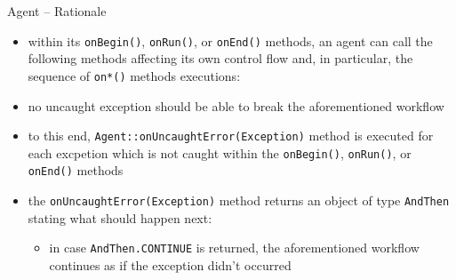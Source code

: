 \documentclass[presentation]{beamer}\mode<presentation>{\usetheme{AMSCesenaPurpleAndGold}}
\begin{document}
\begin{frame}[allowframebreaks]{Agent -- Rationale}
\begin{itemize}
        \vspace{.3cm}
        
        \item within its \texttt{onBegin()}, \texttt{onRun()}, or \texttt{onEnd()} methods, an agent can call the following methods affecting its own control flow and, in particular, the sequence of \texttt{on*()} methods executions:
        
        \framebreak
        
        \item \alert{no uncaught exception} should be able to break the aforementioned workflow
        
        \vspace{.3cm}
        
        \item to this end, \texttt{Agent::\alert{onUncaughtError(Exception)}} method is executed for each excpetion which is not caught within the \texttt{onBegin()}, \texttt{onRun()}, or \texttt{onEnd()} methods
        
        \vspace{.3cm}
        
        \item the \texttt{onUncaughtError(Exception)} method returns an object of type \texttt{AndThen} stating what should happen next:
        \begin{itemize}
            \item in case \texttt{AndThen.\alert{CONTINUE}} is returned, the aforementioned workflow continues as if the exception didn't occurred
            

\end{itemize}
\end{itemize}
\end{frame}
\end{document}
